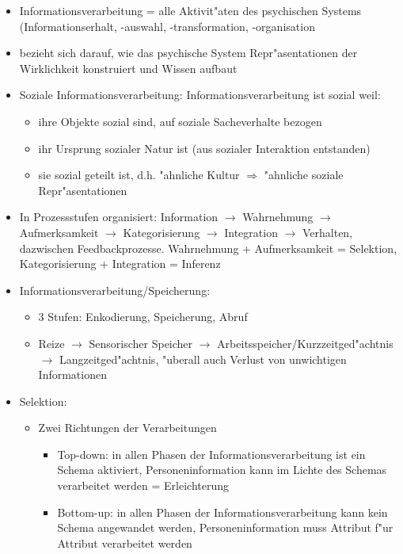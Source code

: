 \begin{itemize}
	\item
		Informationsverarbeitung = alle Aktivit"aten des psychischen Systems (Informationserhalt, -auswahl, -transformation, -organisation
	\item
		bezieht sich darauf, wie das psychische System Repr"asentationen der Wirklichkeit konstruiert und Wissen aufbaut
	\item
		Soziale Informationsverarbeitung: Informationsverarbeitung ist sozial weil:
		\begin{itemize}
			\item
				ihre Objekte sozial sind, auf soziale Sacheverhalte bezogen
			\item
				ihr Ursprung sozialer Natur ist (aus sozialer Interaktion entstanden)
			\item
				sie sozial geteilt ist, d.h. "ahnliche Kultur $\Rightarrow$ "ahnliche soziale Repr"asentationen
		\end{itemize}
	\item
		In Prozessstufen organisiert: Information  $\rightarrow$ Wahrnehmung  $\rightarrow$ Aufmerksamkeit $\rightarrow$ Kategorisierung $\rightarrow$ 
		Integration  $\rightarrow$ Verhalten, dazwischen Feedbackprozesse. Wahrnehmung + Aufmerksamkeit = Selektion, Kategorisierung + Integration = Inferenz
	\item
		Informationsverarbeitung/Speicherung:
		\begin{itemize}
			\item
				3 Stufen: Enkodierung, Speicherung, Abruf
			\item
				Reize $\rightarrow$ Sensorischer Speicher $\rightarrow$ Arbeitsspeicher/Kurzzeitged"achtnis $\rightarrow$ Langzeitged"achtnis, "uberall auch Verlust von unwichtigen Informationen
		\end{itemize}
	\item
		Selektion:
		\begin{itemize}
			\item
				Zwei Richtungen der Verarbeitungen
				\begin{itemize}
					\item
						Top-down: in allen Phasen der Informationsverarbeitung ist ein Schema aktiviert, Personeninformation kann im Lichte des Schemas verarbeitet werden = Erleichterung
					\item
						Bottom-up: in allen Phasen der Informationsverarbeitung kann kein Schema angewandet werden, Personeninformation muss Attribut f"ur Attribut verarbeitet werden
				\end{itemize}

\end{itemize}
\end{itemize}
